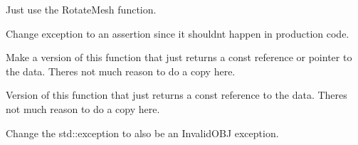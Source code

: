 \begin{DoxyRefList}
Just use the Rotate\+Mesh function. 



Change exception to an assertion since it shouldn\textquotesingle{}t happen in production code.  
\item[Member \mbox{\hyperlink{a01351_af2d1b696c55aa036cff585d2e7eba50b}{HF\+::Geometry\+::Mesh\+Info\texorpdfstring{$<$}{<} numeric\+\_\+type \texorpdfstring{$>$}{>}\+::Get\+Indexed\+Vertices}} () const]\label{a00452__todo000012}%
%
 Make a version of this function that just returns a const reference or pointer to the data. There\textquotesingle{}s not much reason to do a copy here.  
\item[Member \mbox{\hyperlink{a01351_afddea10734ba213b2bb5cc148c24c942}{HF\+::Geometry\+::Mesh\+Info\texorpdfstring{$<$}{<} numeric\+\_\+type \texorpdfstring{$>$}{>}\+::get\+Raw\+Indices}} () const]\label{a00452__todo000013}%
%
 Version of this function that just returns a const reference to the data. There\textquotesingle{}s not much reason to do a copy here. 
\item[Member \mbox{\hyperlink{a01351_a1487a083b0dc49eea88d7a0f04b270d0}{HF\+::Geometry\+::Mesh\+Info\texorpdfstring{$<$}{<} numeric\+\_\+type \texorpdfstring{$>$}{>}\+::Mesh\+Info}} (const std\+::vector\texorpdfstring{$<$}{<} std\+::array$<$ numeric\+\_\+type, 3 $>$ \texorpdfstring{$>$}{>} \&vertices, int id, std\+::string name=\char`\"{}\char`\"{})]\label{a00452__todo000008}%
%
Change the std\+::exception to also be an Invalid\+OBJ exception. 




\end{DoxyRefList}
